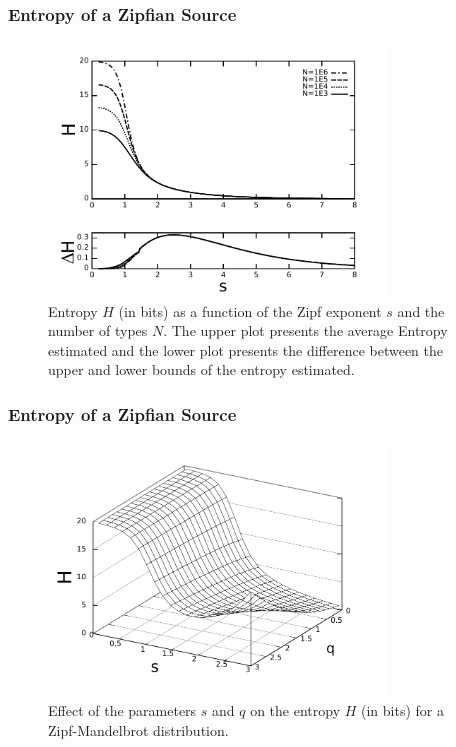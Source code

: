 \documentclass[notes]{beamer}
\begin{document}
\frame
{
  \frametitle{Entropy of a Zipfian Source}
  \vspace{-0.5cm}
  \begin{figure}[h]
  \centering
  \includegraphics[width=0.8\textwidth]{imagespresentation/entropy_N_s_limits_fulldh_pb2.pdf}
  \vspace{-0.2cm}
  \caption{\scriptsize Entropy $H$ (in bits) as a function of the Zipf exponent $s$ and the number of types $N$. The upper plot presents the average Entropy estimated and the lower plot presents the difference between the upper and lower bounds of the entropy estimated.}
  \label{fig:entropy_N_s}
  \end{figure}
}


\frame
{
  \frametitle{Entropy of a Zipfian Source}
  \vspace{-0.5cm}
  \begin{figure}[h]
  \centering
  \includegraphics[width=0.8\textwidth]{images/zipfmandelbrot_entropy_sq_surface.pdf}
  \caption{Effect of the parameters $s$ and $q$ on the entropy $H$ (in bits) for a Zipf-Mandelbrot distribution.}
  \label{fig:zipfmandelbrot_entropy_sq_surface}
  \end{figure}
}
\end{document}
